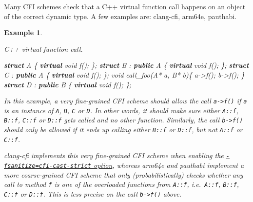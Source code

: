 \documentclass[
  a4paper,
]{report}
\newtheorem{example}{Example}
\newenvironment{Shaded}{}{}
\newcommand{\DataTypeTok}[1]{\textcolor[rgb]{0.56,0.13,0.00}{#1}}
\newcommand{\KeywordTok}[1]{\textcolor[rgb]{0.00,0.44,0.13}{\textbf{#1}}}
\newcommand{\NormalTok}[1]{#1}
\newcommand{\OperatorTok}[1]{\textcolor[rgb]{0.40,0.40,0.40}{#1}}
\begin{document}
Many CFI schemes check that a C++  virtual function call
happens on an object of the correct dynamic type. A few examples are:
clang-cfi, arm64e, pauthabi.

\begin{example}

\label{}

\textup{C++ virtual function call.}

\begin{Shaded}
\begin{Highlighting}[]
\KeywordTok{struct}\NormalTok{ A }\OperatorTok{\{}
  \KeywordTok{virtual} \DataTypeTok{void}\NormalTok{ f}\OperatorTok{();}
\OperatorTok{\};}
\KeywordTok{struct}\NormalTok{ B }\OperatorTok{:} \KeywordTok{public}\NormalTok{ A }\OperatorTok{\{}
  \KeywordTok{virtual} \DataTypeTok{void}\NormalTok{ f}\OperatorTok{();}
\OperatorTok{\};}
\KeywordTok{struct}\NormalTok{ C }\OperatorTok{:} \KeywordTok{public}\NormalTok{ A }\OperatorTok{\{}
  \KeywordTok{virtual} \DataTypeTok{void}\NormalTok{ f}\OperatorTok{();}
\OperatorTok{\};}
\DataTypeTok{void}\NormalTok{ call\_foo}\OperatorTok{(}\NormalTok{A}\OperatorTok{*}\NormalTok{ a}\OperatorTok{,}\NormalTok{ B}\OperatorTok{*}\NormalTok{ b}\OperatorTok{)\{}
\NormalTok{  a}\OperatorTok{{-}\textgreater{}}\NormalTok{f}\OperatorTok{();}
\NormalTok{  b}\OperatorTok{{-}\textgreater{}}\NormalTok{f}\OperatorTok{();}
\OperatorTok{\}}
\KeywordTok{struct}\NormalTok{ D }\OperatorTok{:} \KeywordTok{public}\NormalTok{ B }\OperatorTok{\{}
  \KeywordTok{virtual} \DataTypeTok{void}\NormalTok{ f}\OperatorTok{();}
\OperatorTok{\};}
\end{Highlighting}
\end{Shaded}

In this example, a very fine-grained CFI scheme should allow the call
\texttt{a-\textgreater{}f()} if \texttt{a} is an instance of \texttt{A},
\texttt{B}, \texttt{C} or \texttt{D}. In other words, it should make
sure either \texttt{A::f}, \texttt{B::f}, \texttt{C::f} or \texttt{D::f}
gets called and no other function. Similarly, the call
\texttt{b-\textgreater{}f()} should only be allowed if it ends up
calling either \texttt{B::f} or \texttt{D::f}, but not \texttt{A::f} or
\texttt{C::f}.

clang-cfi implements this very fine-grained CFI scheme when enabling the
\href{https://clang.llvm.org/docs/ControlFlowIntegrity.html\#strictness}{\texttt{-fsanitize=cfi-cast-strict}
option}, whereas arm64e and pauthabi implement a more coarse-grained CFI
scheme that only (probabilistically) checks whether any call to method
\texttt{f} is one of the overloaded functions from \texttt{A::f},
i.e.~\texttt{A::f}, \texttt{B::f}, \texttt{C::f} or \texttt{D::f}. This
is less precise on the call \texttt{b-\textgreater{}f()} above.

\end{example}
\end{document}
